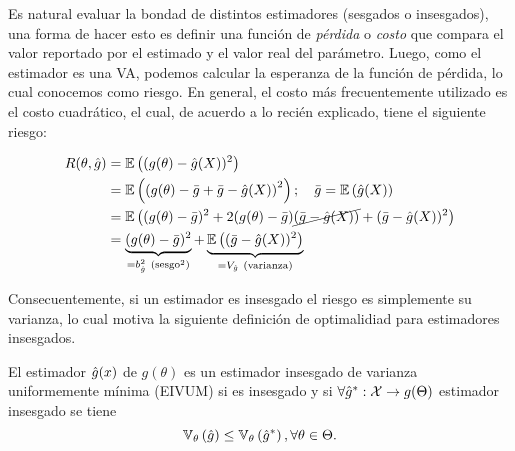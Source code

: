Es natural evaluar la bondad de distintos estimadores (sesgados o insesgados), una forma de hacer esto es definir una función de \textit{pérdida} o \textit{costo} que compara el valor reportado por el estimado y el valor real del parámetro. Luego, como el estimador es una VA, podemos calcular la esperanza de la función de pérdida, lo cual conocemos como riesgo. En general, el costo más frecuentemente utilizado es el costo cuadrático, el cual, de acuerdo a lo recién explicado, tiene el siguiente riesgo: 

\begin{alignat*}{3}
 	R(\theta, \hat{g})  &= \mathbb{E} \left((g(\theta) - { \hat{g}(X)})^2\right)\\
 						& = \mathbb{E} \left(\left(g(\theta) - \bar{g}+ \bar{g} -{ \hat{g}(X)}\right)^2\right); \quad \bar{g} = \mathbb{E} \left( { \hat{g}(X)}\right)\\
 						& = \mathbb{E} \left((g(\theta) - \bar{g})^2+2(g(\theta) - \bar{g})\cancel{(\bar{g} -{ \hat{g}(X)})} +  (\bar{g} -{ \hat{g}(X)})^2\right)\\
 						& = \underbrace{(g(\theta) - \bar{g})^2}_{=b_{{ \hat{g}}}^2\ (\text{sesgo}^2)} +  \underbrace{\mathbb{E} \left((\bar{g} -{ \hat{g}(X)})^2\right)}_{=V_{{ \hat{g}}}\ \text{(varianza)}}
 \end{alignat*} 

 Consecuentemente, si un estimador es insesgado el riesgo es simplemente su varianza, lo cual motiva la siguiente definición de optimalidiad para estimadores insesgados. 

 \begin{definition}
  	El estimador ${ \hat{g}}(x)$ de $g(\theta)$ es un estimador insesgado de varianza uniformemente mínima (EIVUM) si es insesgado y si $\forall { \hat{g}}^*:{\mathcal X}\rightarrow g(\Theta)$ estimador insesgado se tiene
  	\begin{equation}
  		\mathbb{V}_\theta \left({ \hat{g}}\right)\leq\mathbb{V}_\theta \left({ \hat{g}}^*\right), \forall \theta\in\Theta.
  	\end{equation}
  \end{definition} 

